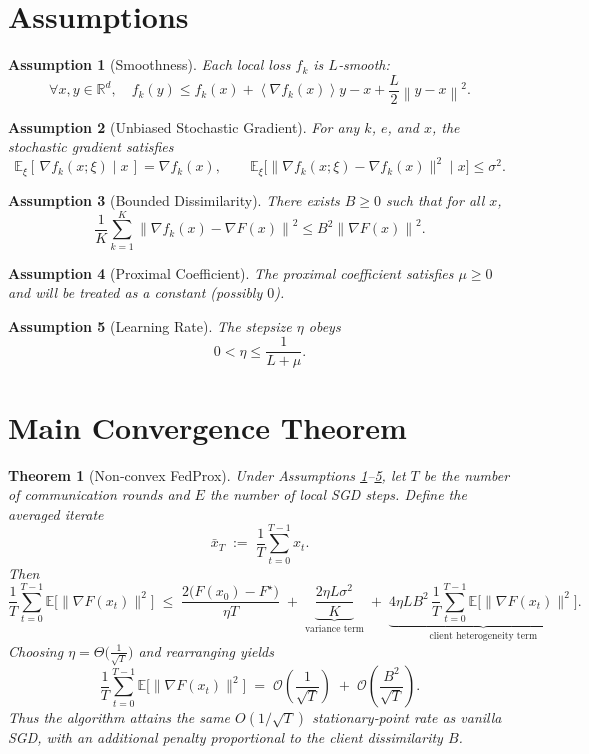 \documentclass{article}
\newtheorem{theorem}{Theorem}
\newtheorem{assumption}{Assumption}
\newcommand{\E}{\mathbb{E}}
\newcommand{\norm}[1]{\left\lVert#1\right\rVert}
\newcommand{\inner}[1]{\left\langle#1\right\rangle}
\begin{document}
\section*{Assumptions}
\begin{assumption}[Smoothness]\label{ass:smooth}
Each local loss $f_k$ is $L$‑smooth:
\[
\forall x,y\in\mathbb{R}^d,\quad
f_k(y)\le f_k(x)+\inner{\nabla f_k(x)}{y-x}+\frac{L}{2}\norm{y-x}^2 .
\]
\end{assumption}

\begin{assumption}[Unbiased Stochastic Gradient]\label{ass:unbiased}
For any $k$, $e$, and $x$, the stochastic gradient satisfies
\[
\E_{\xi}[\,\nabla f_k(x;\xi)\mid x\,]=\nabla f_k(x),\qquad
\E_{\xi}\!\bigl[\|\nabla f_k(x;\xi)-\nabla f_k(x)\|^{2}\mid x\bigr]\le\sigma^{2}.
\]
\end{assumption}

\begin{assumption}[Bounded Dissimilarity]\label{ass:dissim}
There exists $B\ge0$ such that for all $x$,
\[
\frac{1}{K}\sum_{k=1}^{K}\norm{\nabla f_k(x)-\nabla F(x)}^{2}\le B^{2}\norm{\nabla F(x)}^{2}.
\]
\end{assumption}

\begin{assumption}[Proximal Coefficient]\label{ass:mu}
The proximal coefficient satisfies $\mu\ge 0$ and will be treated as a constant (possibly $0$). 
\end{assumption}

\begin{assumption}[Learning Rate]\label{ass:eta}
The stepsize $\eta$ obeys
\[
0<\eta\le \frac{1}{L+\mu}.
\]
\end{assumption}

\section*{Main Convergence Theorem}
\begin{theorem}[Non‑convex FedProx]\label{thm:main}
Under Assumptions \ref{ass:smooth}--\ref{ass:eta}, let $T$ be the number of communication rounds and $E$ the number of local SGD steps. Define the averaged iterate
\[
\bar{x}_T\;:=\;\frac{1}{T}\sum_{t=0}^{T-1}x_t .
\]
Then
\[
\frac{1}{T}\sum_{t=0}^{T-1}\E\!\bigl[\|\nabla F(x_t)\|^{2}\bigr]
\;\le\;
\frac{2\bigl(F(x_0)-F^{\star}\bigr)}{\eta T}
\;+\;
\underbrace{ \frac{2\eta L\sigma^{2}}{K} }_{\text{variance term}}
\;+\;
\underbrace{ 4\eta L B^{2}\,\frac{1}{T}\sum_{t=0}^{T-1}\E\!\bigl[\|\nabla F(x_t)\|^{2}\bigr] }_{\text{client heterogeneity term}} .
\]
Choosing $\eta = \Theta\!\bigl(\frac{1}{\sqrt{T}}\bigr)$ and rearranging yields
\[
\frac{1}{T}\sum_{t=0}^{T-1}\E\!\bigl[\|\nabla F(x_t)\|^{2}\bigr]
\;=\;
\mathcal{O}\!\left(\frac{1}{\sqrt{T}}\right)
\;+\;
\mathcal{O}\!\left(\frac{B^{2}}{\sqrt{T}}\right).
\]
Thus the algorithm attains the same $O(1/\sqrt{T})$ stationary‑point rate as vanilla SGD, with an additional penalty proportional to the client dissimilarity $B$.
\end{theorem}
\end{document}
